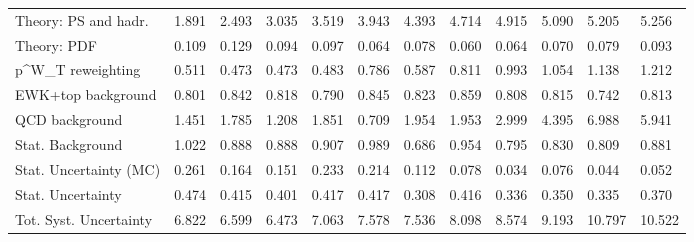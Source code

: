 \begin{tabular}{l|p{0.6cm}p{0.6cm}p{0.6cm}p{0.6cm}p{0.6cm}p{0.6cm}p{0.6cm}p{0.6cm}p{0.6cm}p{0.6cm}p{0.6cm}}
Theory: PS and hadr.                     & 1.891 & 2.493 & 3.035 & 3.519 & 3.943 & 4.393 & 4.714 & 4.915 & 5.090 & 5.205 & 5.256 \\
Theory: PDF                              & 0.109 & 0.129 & 0.094 & 0.097 & 0.064 & 0.078 & 0.060 & 0.064 & 0.070 & 0.079 & 0.093 \\
p^{W}_{T} reweighting                    & 0.511 & 0.473 & 0.473 & 0.483 & 0.786 & 0.587 & 0.811 & 0.993 & 1.054 & 1.138 & 1.212 \\
EWK+top background                       & 0.801 & 0.842 & 0.818 & 0.790 & 0.845 & 0.823 & 0.859 & 0.808 & 0.815 & 0.742 & 0.813 \\
QCD background                           & 1.451 & 1.785 & 1.208 & 1.851 & 0.709 & 1.954 & 1.953 & 2.999 & 4.395 & 6.988 & 5.941 \\
Stat. Background                         & 1.022 & 0.888 & 0.888 & 0.907 & 0.989 & 0.686 & 0.954 & 0.795 & 0.830 & 0.809 & 0.881 \\
Stat. Uncertainty (MC)                   & 0.261 & 0.164 & 0.151 & 0.233 & 0.214 & 0.112 & 0.078 & 0.034 & 0.076 & 0.044 & 0.052 \\
\hline
Stat. Uncertainty                        & 0.474 & 0.415 & 0.401 & 0.417 & 0.417 & 0.308 & 0.416 & 0.336 & 0.350 & 0.335 & 0.370 \\
\hline
Tot. Syst. Uncertainty                   & 6.822 & 6.599 & 6.473 & 7.063 & 7.578 & 7.536 & 8.098 & 8.574 & 9.193 & 10.797 & 10.522 \\
\hline
\end{tabular}

